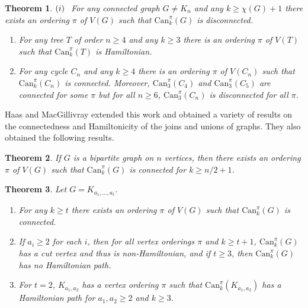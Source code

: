 \documentclass[12pt]{article}%
\newtheorem{theorem}{Theorem}[section]
\begin{document}
\begin{theorem}
\label{ThmCan}\emph{\cite{26CM-Haas2012}}\hspace{0.1in}$(i)\hspace{0.1in}$For
any connected graph $G\neq K_{n}$ and any $k\geq\chi(G)+1$ there exists an
ordering $\pi$ of $V(G)$ such that $\mathrm{Can}_{k}^{\pi}(G)$ is disconnected.

\begin{enumerate}
\item[$(ii)$] For any tree $T$ of order $n\geq4$ and any $k\geq3$ there is an
ordering $\pi$ of $V(T)$ such that $\mathrm{Can}_{k}^{\pi}(T)$ is Hamiltonian.

\item[$(iii)$] For any cycle $C_{n}$ and any $k\geq4$ there is an ordering
$\pi$ of $V(C_{n})$ such that $\mathrm{Can}_{k}^{\pi}(C_{n})$ is connected.
Moreover, $\mathrm{Can}_{3}^{\pi}(C_{4})$ and $\mathrm{Can}_{3}^{\pi}(C_{5})$
are connected for some $\pi$ but for all $n\geq6$, $\mathrm{Can}_{3}^{\pi
}(C_{n})$ is disconnected for all $\pi$.
\end{enumerate}
\end{theorem}

Haas and MacGillivray \cite{26CM-HM2018} extended this work and obtained a
variety of results on the connectedness and Hamiltonicity of the joins and
unions of graphs. They also obtained the following results.

\begin{theorem}
\emph{\cite{26CM-HM2018}\hspace{0.1in}}If $G$ is a bipartite graph on $n$
vertices, then there exists an ordering $\pi$ of $V(G)$ such that
$\mathrm{Can}_{k}^{\pi}(G)$ is connected for $k\geq n/2+1$.
\end{theorem}

\begin{theorem}
\emph{\cite{26CM-HM2018}\hspace{0.1in}}Let $G=K_{a_{1},...,a_{t}}$.

\begin{enumerate}
\item[$(i)$] For any $k\geq t$ there exists an ordering $\pi$ of $V(G)$ such
that $\mathrm{Can}_{k}^{\pi}(G)$ is connected.

\item[$(ii)$] If $a_{i}\geq2$ for each $i$, then for all vertex orderings
$\pi$ and $k\geq t+1$, $\mathrm{Can}_{k}^{\pi}(G)$ has a cut vertex and thus
is non-Hamiltonian, and if $t\geq3$, then $\mathrm{Can}_{k}^{\pi}(G)$ has no
Hamiltonian path.

\item[$(iii)$] For $t=2$, $K_{a_{1},a_{2}}$ has a vertex ordering $\pi$ such
that $\mathrm{Can}_{k}^{\pi}(K_{a_{1},a_{2}})$ has a Hamiltonian path for
$a_{1},a_{2}\geq2$ and $k\geq3$.
\end{enumerate}
\end{theorem}
\end{document}
